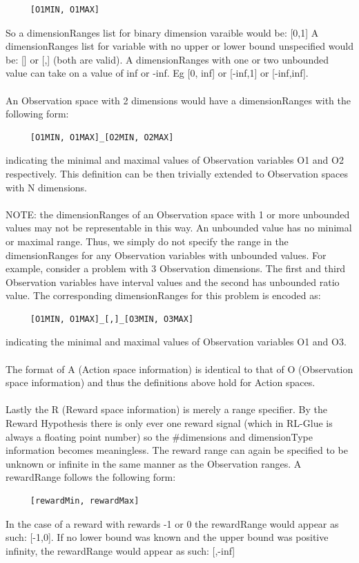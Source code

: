 \documentclass[11pt]{article}
\begin{document}
\begin{verbatim}
     [O1MIN, O1MAX]
\end{verbatim}
So a dimensionRanges list for binary dimension varaible would be: [0,1]
A dimensionRanges list for variable with no upper or lower bound unspecified would be: [] or [,] (both are valid).
A dimensionRanges with one or two unbounded value can take on a value of inf or -inf. Eg [0, inf] or [-inf,1] or [-inf,inf].
\\\\
An Observation space with 2 dimensions would have a dimensionRanges with the following form:
\begin{verbatim}
     [O1MIN, O1MAX]_[O2MIN, O2MAX]
\end{verbatim}
indicating the minimal and maximal values of Observation variables O1 and O2 respectively. This definition can be then trivially extended to Observation spaces with N dimensions.
\\\\
NOTE: the dimensionRanges of an Observation space with 1 or more unbounded values may not be representable in this way. An unbounded value has no minimal or maximal range. Thus, we simply do not specify the range in the dimensionRanges for any Observation variables with unbounded values. For example, consider a problem with 3 Observation dimensions. The first and third Observation variables have interval values and the second has unbounded ratio value. The corresponding dimensionRanges for this problem is encoded as:
\begin{verbatim}
     [O1MIN, O1MAX]_[,]_[O3MIN, O3MAX]
\end{verbatim}
indicating the minimal and maximal values of Observation variables O1 and O3.
\\\\
The format of A (Action space information) is identical to that of O (Observation space information) and thus the definitions above hold for Action spaces.
\\\\
Lastly the R (Reward space information) is merely a range specifier. By the Reward Hypothesis there is only ever one reward signal (which in RL-Glue is always a floating point number) so the \#dimensions and dimensionType information becomes meaningless. The reward range can again be specified to be unknown or infinite in the same manner as the Observation ranges.  A rewardRange follows the following form:
\begin{verbatim}
     [rewardMin, rewardMax]
\end{verbatim}
In the case of a reward with rewards -1 or 0 the rewardRange would appear as such: [-1,0].
If no lower bound was known and the upper bound was positive infinity, the rewardRange would appear as such: [,-inf]
\end{document}
